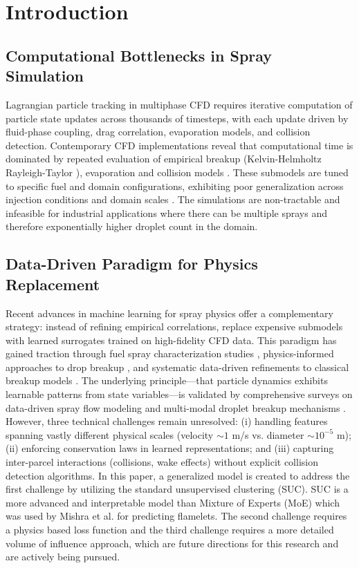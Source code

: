 \documentclass[letterpaper,twocolumn,10pt]{article}
\begin{document}
\section{Introduction}

\subsection{Computational Bottlenecks in Spray Simulation}

Lagrangian particle tracking in multiphase CFD requires iterative computation of particle state updates across thousands of timesteps, with each update driven by fluid-phase coupling, drag correlation, evaporation models, and collision detection. Contemporary CFD implementations \cite{Kosters2011, Housainpour2009, Ghadimi2016, Zhou2018, Nygren2018} reveal that computational time is dominated by repeated evaluation of empirical breakup (Kelvin-Helmholtz Rayleigh-Taylor \cite{Turner2012}), evaporation and collision models \cite{Schmidt2000}. These submodels are tuned to specific fuel and domain configurations, exhibiting poor generalization across injection conditions and domain scales \cite{Teesink2011}. The simulations are non-tractable and infeasible for industrial applications where there can be multiple sprays and therefore exponentially higher droplet count in the domain.

\subsection{Data-Driven Paradigm for Physics Replacement}

Recent advances in machine learning for spray physics offer a complementary strategy: instead of refining empirical correlations, replace expensive submodels with learned surrogates trained on high-fidelity CFD data. This paradigm has gained traction through fuel spray characterization studies \cite{Khan2024}, physics-informed approaches to drop breakup \cite{Cundy2024}, and systematic data-driven refinements to classical breakup models \cite{Li2025}. The underlying principle—that particle dynamics exhibits learnable patterns from state variables—is validated by comprehensive surveys on data-driven spray flow modeling \cite{Salehi2025} and multi-modal droplet breakup mechanisms \cite{Young2026}. However, three technical challenges remain unresolved: (i) handling features spanning vastly different physical scales (velocity $\sim 1$ m/s vs. diameter $\sim 10^{-5}$ m); (ii) enforcing conservation laws in learned representations; and (iii) capturing inter-parcel interactions (collisions, wake effects) without explicit collision detection algorithms. In this paper, a generalized model is created to address the first challenge by utilizing the standard unsupervised clustering (SUC). SUC is a more advanced and interpretable model than Mixture of Experts (MoE) which was used by Mishra et al.\cite{Mishra2023} for predicting flamelets. The second challenge requires a physics based loss function and the third challenge requires a more detailed volume of influence approach, which are future directions for this research and are actively being pursued. 
\end{document}
